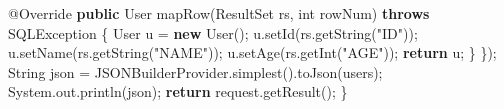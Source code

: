 \documentclass[
]{book}
\newenvironment{Shaded}{\begin{snugshade}}{\end{snugshade}}
\newcommand{\AttributeTok}[1]{\textcolor[rgb]{0.77,0.63,0.00}{#1}}
\newcommand{\BuiltInTok}[1]{#1}
\newcommand{\DataTypeTok}[1]{\textcolor[rgb]{0.13,0.29,0.53}{#1}}
\newcommand{\FunctionTok}[1]{\textcolor[rgb]{0.00,0.00,0.00}{#1}}
\newcommand{\KeywordTok}[1]{\textcolor[rgb]{0.13,0.29,0.53}{\textbf{#1}}}
\newcommand{\NormalTok}[1]{#1}
\newcommand{\StringTok}[1]{\textcolor[rgb]{0.31,0.60,0.02}{#1}}
\begin{document}
\begin{Shaded}
\begin{Highlighting}[]
{            \AttributeTok{@Override}
            \KeywordTok{public}\NormalTok{ User }\FunctionTok{mapRow}\NormalTok{(}\BuiltInTok{ResultSet}\NormalTok{ rs, }\DataTypeTok{int}\NormalTok{ rowNum) }\KeywordTok{throws} \BuiltInTok{SQLException}\NormalTok{ \{}
\NormalTok{                User u = }\KeywordTok{new} \FunctionTok{User}\NormalTok{();}
\NormalTok{                u.}\FunctionTok{setId}\NormalTok{(rs.}\FunctionTok{getString}\NormalTok{(}\StringTok{"ID"}\NormalTok{));}
\NormalTok{                u.}\FunctionTok{setName}\NormalTok{(rs.}\FunctionTok{getString}\NormalTok{(}\StringTok{"NAME"}\NormalTok{));}
\NormalTok{                u.}\FunctionTok{setAge}\NormalTok{(rs.}\FunctionTok{getInt}\NormalTok{(}\StringTok{"AGE"}\NormalTok{));}
                \KeywordTok{return}\NormalTok{ u;}
\NormalTok{            \}}
\NormalTok{        \});}
        \BuiltInTok{String}\NormalTok{ json = JSONBuilderProvider.}\FunctionTok{simplest}\NormalTok{().}\FunctionTok{toJson}\NormalTok{(users);}
        \BuiltInTok{System}\NormalTok{.}\FunctionTok{out}\NormalTok{.}\FunctionTok{println}\NormalTok{(json);}
        \KeywordTok{return}\NormalTok{ request.}\FunctionTok{getResult}\NormalTok{();}
\NormalTok{    \}}

}
\end{Highlighting}
\end{Shaded}
\end{document}
